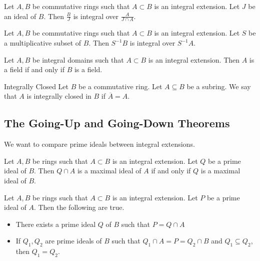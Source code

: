 \documentclass[a4paper]{article}
\begin{document}
\begin{prp}{}{} Let $A,B$ be commutative rings such that $A\subset B$ is an integral extension. Let $J$ be an ideal of $B$. Then $\frac{B}{J}$ is integral over $\frac{A}{J\cap A}$. 
\end{prp}

\begin{prp}{}{} Let $A,B$ be commutative rings such that $A\subset B$ is an integral extension. Let $S$ be a multiplicative subset of $B$. Then $S^{-1}B$ is integral over $S^{-1}A$. 
\end{prp}

\begin{lmm}{}{} Let $A,B$ be integral domains such that $A\subset B$ is an integral extension. Then $A$ is a field if and only if $B$ is a field. 
\end{lmm}

\begin{defn}{Integrally Closed}{} Let $B$ be a commutative ring. Let $A\subseteq B$ be a subring. We say that $A$ is integrally closed in $B$ if $\overline{A}=A$. 
\end{defn}

\subsection{The Going-Up and Going-Down Theorems}
We want to compare prime ideals between integral extensions. 

\begin{prp}{}{} Let $A,B$ be rings such that $A\subset B$ is an integral extension. Let $Q$ be a prime ideal of $B$. Then $Q\cap A$ is a maximal ideal of $A$ if and only if $Q$ is a maximal ideal of $B$. 
\end{prp}

\begin{prp}{}{} Let $A,B$ be rings such that $A\subset B$ is an integral extension. Let $P$ be a prime ideal of $A$. Then the following are true. 
\begin{itemize}
\item There exists a prime ideal $Q$ of $B$ such that $P=Q\cap A$
\item If $Q_1,Q_2$ are prime ideals of $B$ such that $Q_1\cap A=P=Q_2\cap B$ and $Q_1\subseteq Q_2$, then $Q_1=Q_2$. 
\end{itemize}
\end{prp}
\end{document}
